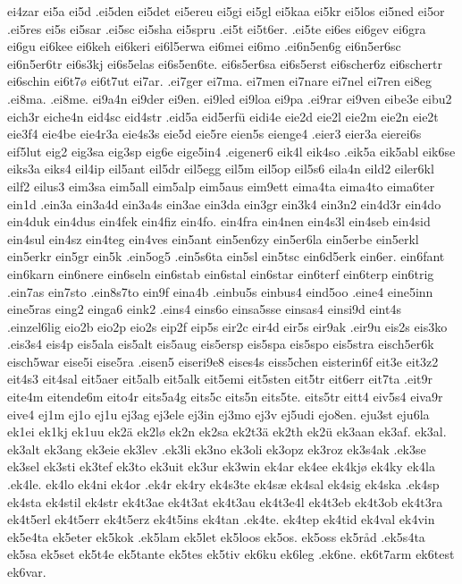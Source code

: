 ei4zar
ei5a
ei5d
.ei5den
ei5det
ei5ereu
ei5gi
ei5gl
ei5kaa
ei5kr
ei5los
ei5ned
ei5or
.ei5res
ei5s
ei5sar
.ei5sc
ei5sha
ei5spru
.ei5t
ei5t6er.
.ei5te
ei6es
ei6gev
ei6gra
ei6gu
ei6kee
ei6keh
ei6keri
ei6l5erwa
ei6mei
ei6mo
.ei6n5en6g
ei6n5er6sc
ei6n5er6tr
ei6s3kj
ei6s5elas
ei6s5en6te.
ei6s5er6sa
ei6s5erst
ei6scher6z
ei6schertr
ei6schin
ei6t7ø
ei6t7ut
ei7ar.
.ei7ger
ei7ma.
ei7men
ei7nare
ei7nel
ei7ren
ei8eg
.ei8ma.
.ei8me.
ei9a4n
ei9der
ei9en.
ei9led
ei9loa
ei9pa
.ei9rar
ei9ven
eibe3e
eibu2
eich3r
eiche4n
eid4sc
eid4str
.eid5a
eid5erfü
eidi4e
eie2d
eie2l
eie2m
eie2n
eie2t
eie3f4
eie4be
eie4r3a
eie4s3s
eie5d
eie5re
eien5s
eienge4
.eier3
eier3a
eierei6s
eif5lut
eig2
eig3sa
eig3sp
eig6e
eige5in4
.eigener6
eik4l
eik4so
.eik5a
eik5abl
eik6se
eiks3a
eiks4
eil4ip
eil5ant
eil5dr
eil5egg
eil5m
eil5op
eil5s6
eila4n
eild2
eiler6kl
eilf2
eilus3
eim3sa
eim5all
eim5alp
eim5aus
eim9ett
eima4ta
eima4to
eima6ter
ein1d
.ein3a
ein3a4d
ein3a4s
ein3ae
ein3da
ein3gr
ein3k4
ein3n2
ein4d3r
ein4do
ein4duk
ein4dus
ein4fek
ein4fiz
ein4fo.
ein4fra
ein4nen
ein4s3l
ein4seb
ein4sid
ein4sul
ein4sz
ein4teg
ein4ves
ein5ant
ein5en6zy
ein5er6la
ein5erbe
ein5erkl
ein5erkr
ein5gr
ein5k
.ein5og5
.ein5s6ta
ein5sl
ein5tsc
ein6d5erk
ein6er.
ein6fant
ein6karn
ein6nere
ein6seln
ein6stab
ein6stal
ein6star
ein6terf
ein6terp
ein6trig
.ein7as
ein7sto
.ein8s7to
ein9f
eina4b
.einbu5s
einbus4
eind5oo
.eine4
eine5inn
eine5ras
eing2
einga6
eink2
.eins4
eins6o
einsa5sse
einsas4
einsi9d
eint4s
.einzel6lig
eio2b
eio2p
eio2s
eip2f
eip5s
eir2c
eir4d
eir5s
eir9ak
.eir9u
eis2s
eis3ko
.eis3s4
eis4p
eis5ala
eis5alt
eis5aug
eis5ersp
eis5spa
eis5spo
eis5stra
eisch5er6k
eisch5war
eise5i
eise5ra
.eisen5
eiseri9e8
eises4s
eiss5chen
eisterin6f
eit3e
eit3z2
eit4s3
eit4sal
eit5aer
eit5alb
eit5alk
eit5emi
eit5sten
eit5tr
eit6err
eit7ta
.eit9r
eite4m
eitende6m
eito4r
eits5a4g
eits5c
eits5n
eits5te.
eits5tr
eitt4
eiv5s4
eiva9r
eive4
ej1m
ej1o
ej1u
ej3ag
ej3ele
ej3in
ej3mo
ej3v
ej5udi
ejo8en.
eju3st
eju6la
ek1ei
ek1kj
ek1uu
ek2ä
ek2lø
ek2n
ek2sa
ek2t3ä
ek2th
ek2ü
ek3aan
ek3af.
ek3al.
ek3alt
ek3ang
ek3eie
ek3lev
.ek3li
ek3no
ek3oli
ek3opz
ek3roz
ek3s4ak
.ek3se
ek3sel
ek3sti
ek3tef
ek3to
ek3uit
ek3ur
ek3win
ek4ar
ek4ee
ek4kjø
ek4ky
ek4la
.ek4le.
ek4lo
ek4ni
ek4or
.ek4r
ek4ry
ek4s3te
ek4sæ
ek4sal
ek4sig
ek4ska
.ek4sp
ek4sta
ek4stil
ek4str
ek4t3ae
ek4t3at
ek4t3au
ek4t3e4l
ek4t3eb
ek4t3ob
ek4t3ra
ek4t5erl
ek4t5err
ek4t5erz
ek4t5ins
ek4tan
.ek4te.
ek4tep
ek4tid
ek4val
ek4vin
ek5e4ta
ek5eter
ek5kok
.ek5lam
ek5let
ek5loos
ek5os.
ek5oss
ek5råd
.ek5s4ta
ek5sa
ek5set
ek5t4e
ek5tante
ek5tes
ek5tiv
ek6ku
ek6leg
.ek6ne.
ek6t7arm
ek6test
ek6var.
